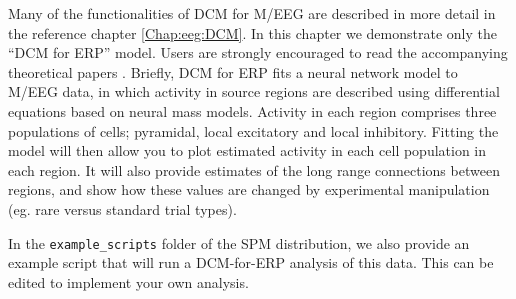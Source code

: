 Many of the functionalities of DCM for M/EEG are described in more detail in the reference chapter \ref{Chap:eeg:DCM}. In this chapter we demonstrate only the ``DCM for ERP'' model. 
Users are strongly encouraged to read the accompanying theoretical papers \cite{od_dcm_erp,sjk_dcm_erp}. Briefly, DCM for ERP fits a  neural network model to M/EEG data, in which activity in source regions are described using differential equations based on neural mass models. Activity in each region comprises three populations of cells; pyramidal, local excitatory and local inhibitory. Fitting the model will then allow you to plot estimated activity in each cell population in each region. It will also provide estimates of the long range connections between regions, and show how these values are changed by experimental manipulation (eg. rare versus standard trial types).
  
In the \texttt{example\_scripts} folder of the SPM distribution, we also provide an example script that will run a DCM-for-ERP analysis of this data. This can be edited to implement your own analysis.

